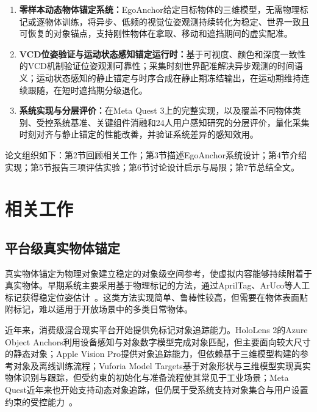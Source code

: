 \documentclass[review]{vgtc}
\begin{document}
\begin{enumerate}
  \item \textbf{零样本动态物体锚定系统：}EgoAnchor给定目标物体的三维模型，无需物理标记或逐物体训练，将异步、低频的视觉位姿观测持续转化为稳定、世界一致且可恢复的对象锚点，支持刚性物体在拿取、移动和遮挡期间的虚实配准。

  \item \textbf{VCD位姿验证与运动状态感知锚定运行时：}基于可视度、颜色和深度一致性的VCD机制验证位姿观测可靠性；采集时刻世界配准解决异步观测的时间语义；运动状态感知的静止锚定与时序合成在静止期冻结输出，在运动期维持连续跟随，在短时遮挡期分级退化。

  \item \textbf{系统实现与分层评价：}在Meta Quest 3上的完整实现，以及覆盖不同物体类别、受控系统基准、关键组件消融和24人用户感知研究的分层评价，量化采集时刻对齐与静止锚定的性能改善，并验证系统差异的感知效用。
\end{enumerate}

论文组织如下：第2节回顾相关工作；第3节描述EgoAnchor系统设计；第4节介绍实现；第5节报告三项评估实验；第6节讨论设计启示与局限；第7节总结全文。

\section{相关工作}\label{sec:related-work}

\subsection{平台级真实物体锚定}

真实物体锚定为物理对象建立稳定的对象级空间参考，使虚拟内容能够持续附着于真实物体。早期系统主要采用基于物理标记的方法，通过AprilTag、ArUco等人工标记获得稳定位姿估计~\cite{kato1999artoolkit,olson2011apriltag,garridojurado2014aruco}。这类方法实现简单、鲁棒性较高，但需要在物体表面贴附标记，难以适用于开放场景中的多类日常物体。

近年来，消费级混合现实平台开始提供免标记对象追踪能力。HoloLens 2的Azure Object Anchors利用设备感知与对象数字模型完成对象匹配，但主要面向较大尺寸的静态对象；Apple Vision Pro提供对象追踪能力，但依赖基于三维模型构建的参考对象及离线训练流程；Vuforia Model Targets基于对象形状与三维模型实现真实物体识别与跟踪，但受约束的初始化与准备流程使其常见于工业场景；Meta Quest近年来也开始支持动态对象追踪，但仍属于受系统支持对象集合与用户设置约束的受控能力~\cite{appleObjectAnchor,azureObjectAnchors,vuforiaModelTargets,metaDynamicObjectTracker}。
\end{document}
